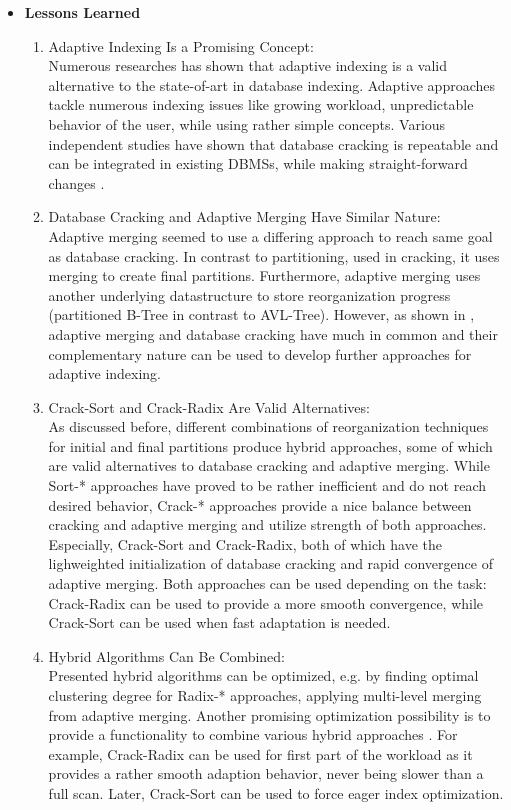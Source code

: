 \documentclass[10pt, conference, compsocconf]{IEEEtran}
\begin{document}
\begin{itemize}
\item{\textbf{Lessons Learned}}
\begin{enumerate}
\item{Adaptive Indexing Is a Promising Concept:}\\
Numerous researches has shown that adaptive indexing is a valid alternative to the state-of-art in database indexing. Adaptive approaches tackle numerous indexing issues like growing workload, unpredictable behavior of the user, while using rather simple concepts. Various independent studies have shown that database cracking is repeatable and can be integrated in existing DBMSs, while making straight-forward changes \cite{cracking}.\\
\item{Database Cracking and Adaptive Merging Have Similar Nature:}\\
Adaptive merging seemed to use a differing approach to reach same goal as database cracking. In contrast to partitioning, used in cracking, it uses merging to create final partitions. Furthermore, adaptive merging uses another underlying datastructure to store reorganization progress (partitioned B-Tree in contrast to AVL-Tree). However, as shown in \cite{hybrid}, adaptive merging and database cracking have much in common and their complementary nature can be used to develop further approaches for adaptive indexing.\\
\item{Crack-Sort and Crack-Radix Are Valid Alternatives:}\\
As discussed before, different combinations of reorganization techniques for initial and final partitions produce hybrid approaches, some of which are valid alternatives to database cracking and adaptive merging. While Sort-* approaches have proved to be rather inefficient and do not reach desired behavior, Crack-* approaches provide a nice balance between cracking and adaptive merging and utilize strength of both approaches. Especially, Crack-Sort and Crack-Radix, both of which have the lighweighted initialization of database cracking and rapid convergence of adaptive merging. Both approaches can be used depending on the task: Crack-Radix can be used to provide a more smooth convergence, while Crack-Sort can be used when fast adaptation is needed.\\
\item{Hybrid Algorithms Can Be Combined:}\\
Presented hybrid algorithms can be optimized, e.g. by finding optimal clustering degree for Radix-* approaches, applying multi-level merging from adaptive merging. Another promising optimization possibility is to provide a functionality to combine various hybrid approaches \cite{hybrid}. For example, Crack-Radix can be used for first part of the workload as it provides a rather smooth adaption behavior, never being slower than a full scan. Later, Crack-Sort can be used to force eager index optimization.\\

\end{enumerate}
\end{itemize}
\end{document}
